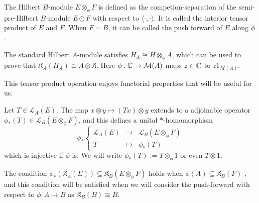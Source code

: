 \begin{definition}
The Hilbert $B$-module $E\otimes_\phi F$ is defined as the competion-separation of the semi-pre-Hilbert $B$-module $E\odot F$ with respect to $\langle \cdot , \cdot \rangle$. It is called the interior tensor product of $E$ and $F$. When $F=B$, it can be called the push forward of $E$ along $\phi$.
\end{definition} 

\begin{Expl}
The standard Hilbert $A$-module satisfies $H_A \cong H\otimes_\phi A$, which can be used to prove that $\mathfrak K_A(H_A) \cong A\otimes \mathfrak K$. Here $\phi : \mathbb C\rightarrow \mathcal M(A)$ maps $z\in \mathbb C$ to $z1_{\mathcal M(A)}$.
\end{Expl}

This tensor product operation enjoys functorial properties that will be useful for us. 

\begin{prop}\cite{Lance}
Let $T\in\mathcal L_A(E)$. The map $x\otimes y \mapsto (Tx)\otimes y$ extends to a adjoinable operator $\phi_*(T)\in\mathcal L_B(E\otimes_\phi F)$, and this defines a unital $*$-homomorphism 
\[\phi_*\left\{\begin{array}{rcl} \mathcal L_A(E) & \rightarrow & \mathcal L_B(E\otimes_\phi F) \\ T & \mapsto & \phi_*(T)\end{array}\right.\]
which is injective if $\phi$ is. We will write $\phi_*(T) := T\otimes_\phi 1$ or even $T\otimes 1$. 
\end{prop} 

\begin{rk}
The condition $\phi_*(\mathfrak K_A(E))\subseteq \mathfrak K_B(E\otimes_\phi F)$ holds when $\phi(A)\subseteq \mathfrak K_B(F)$ \cite{Lance}, and this condition will be satisfied when we will consider the push-forward with respect to $\phi : A\rightarrow B$ as $\mathfrak K_B(B) \cong B$. 
\end{rk}

